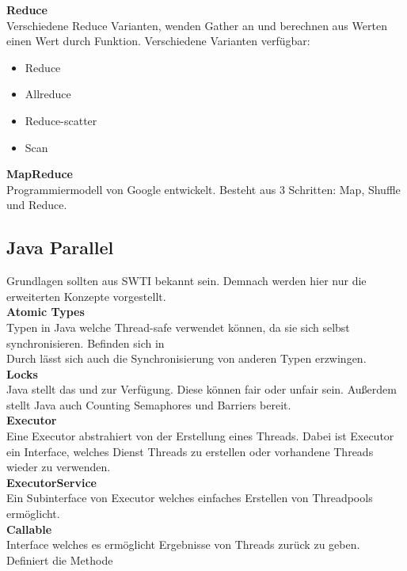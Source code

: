 \textbf{Reduce}\\
Verschiedene Reduce Varianten, wenden Gather an und berechnen aus Werten einen Wert durch Funktion.
Verschiedene Varianten verfügbar:
\begin{itemize}
  \item Reduce
  \item Allreduce
  \item Reduce-scatter
  \item Scan
\end{itemize}


\textbf{MapReduce}\\
Programmiermodell von Google entwickelt.
Besteht aus 3 Schritten: Map, Shuffle und Reduce.

\newpage
\subsection{Java Parallel}%
\label{pp:sub:javas-parallel}
Grundlagen sollten aus SWTI bekannt sein. Demnach werden hier nur die erweiterten Konzepte vorgestellt.\\

\textbf{Atomic Types}\\
Typen in Java welche Thread-safe verwendet können, da sie sich selbst synchronisieren.
Befinden sich in \\
Durch  lässt sich auch die Synchronisierung von anderen Typen erzwingen.\\

\textbf{Locks}\\
Java stellt das  und  zur Verfügung. Diese können fair oder unfair sein.
Außerdem stellt Java auch Counting Semaphores und Barriers bereit.\\

\textbf{Executor}\\
Eine Executor abstrahiert von der Erstellung eines Threads. Dabei ist Executor ein Interface, welches Dienst Threads zu erstellen
oder vorhandene Threads wieder zu verwenden.\\

\textbf{ExecutorService}\\
Ein Subinterface von Executor welches einfaches Erstellen von Threadpools ermöglicht.\\

\textbf{Callable}\\
Interface welches es ermöglicht Ergebnisse von Threads zurück zu geben.
Definiert die Methode \\

